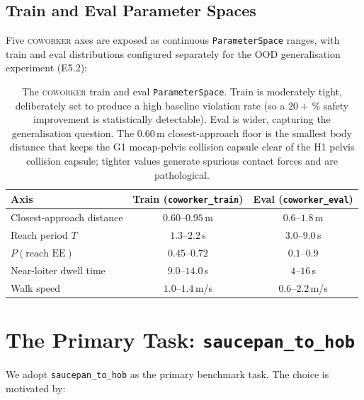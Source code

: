 \documentclass[11pt,a4paper]{report}
\newcommand{\coworker}{\textsc{coworker}}
\begin{document}
\subsection{Train and Eval Parameter Spaces}
\label{sec:bench:coworker:params}

Five \coworker{} axes are exposed as continuous
\texttt{ParameterSpace} ranges, with train and eval distributions
configured separately for the OOD generalisation experiment (E5.2):

\begin{table}[h]
\centering
\small
\caption{The \coworker{} train and eval \texttt{ParameterSpace}.
Train is moderately tight, deliberately set to produce a high
baseline violation rate (so a $20+\,\%$ safety improvement is
statistically detectable). Eval is wider, capturing the
generalisation question. The 0.60\,m closest-approach floor is the
smallest body distance that keeps the G1 mocap-pelvis collision
capsule clear of the H1 pelvis collision capsule; tighter values
generate spurious contact forces and are pathological.}
\label{tab:coworker-params}
\begin{tabular}{lcc}
\toprule
Axis & Train (\texttt{coworker\_train}) & Eval (\texttt{coworker\_eval}) \\
\midrule
Closest-approach distance     & $0.60$--$0.95$\,m  & $0.6$--$1.8$\,m  \\
Reach period $T$              & $1.3$--$2.2$\,s    & $3.0$--$9.0$\,s  \\
$P(\text{reach EE})$          & $0.45$--$0.72$     & $0.1$--$0.9$     \\
Near-loiter dwell time        & $9.0$--$14.0$\,s   & $4$--$16$\,s     \\
Walk speed                    & $1.0$--$1.4$\,m/s  & $0.6$--$2.2$\,m/s\\
\bottomrule
\end{tabular}
\end{table}

\section{The Primary Task: \texttt{saucepan\_to\_hob}}
\label{sec:bench:task}

We adopt \texttt{saucepan\_to\_hob} as the primary benchmark task.
The choice is motivated by:
\end{document}
